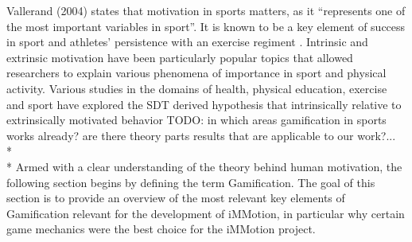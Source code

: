 Vallerand (2004) states that motivation in sports matters, as it ``represents one of the most important variables in sport''. It is known to be a key element of success in sport and athletes' persistence with an exercise regiment \cite{vallerand2007intrinsic}. Intrinsic and extrinsic motivation have been particularly popular topics that allowed researchers to explain various phenomena of importance in sport and physical activity. Various studies in the domains of health, physical education, exercise and sport have explored the SDT derived hypothesis that intrinsically relative to extrinsically motivated behavior  
TODO: in which areas gamification in sports works already? are there theory parts results that are applicable to our work?...\\*\\*
Armed with a clear understanding of the theory behind human motivation, the following section begins by defining the term Gamification. The goal of this section is to provide an overview of the most relevant key elements of Gamification relevant for the development of iMMotion, in particular why certain game mechanics were the best choice for the iMMotion project.
